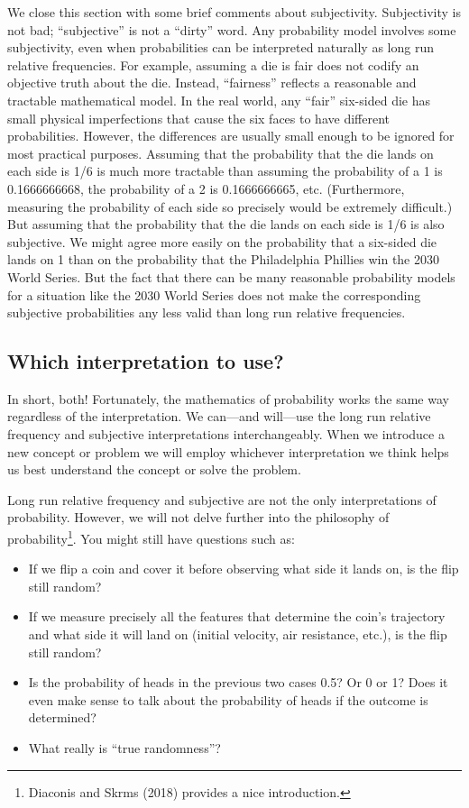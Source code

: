 \documentclass[
  letterpaper,
  DIV=11,
  numbers=noendperiod]{scrreprt}
\providecommand{\tightlist}{%
  \setlength{\itemsep}{0pt}\setlength{\parskip}{0pt}}
\theoremstyle{plain}
\theoremstyle{definition}
\theoremstyle{definition}
\theoremstyle{definition}
\theoremstyle{remark}
\begin{document}
We close this section with some brief comments about subjectivity.
Subjectivity is not bad; ``subjective'' is not a ``dirty'' word. Any
probability model involves some subjectivity, even when probabilities
can be interpreted naturally as long run relative frequencies. For
example, assuming a die is fair does not codify an objective truth about
the die. Instead, ``fairness'' reflects a reasonable and tractable
mathematical model. In the real world, any ``fair'' six-sided die has
small physical imperfections that cause the six faces to have different
probabilities. However, the differences are usually small enough to be
ignored for most practical purposes. Assuming that the probability that
the die lands on each side is 1/6 is much more tractable than assuming
the probability of a 1 is 0.1666666668, the probability of a 2 is
0.1666666665, etc. (Furthermore, measuring the probability of each side
so precisely would be extremely difficult.) But assuming that the
probability that the die lands on each side is 1/6 is also subjective.
We might agree more easily on the probability that a six-sided die lands
on 1 than on the probability that the Philadelphia Phillies win the 2030
World Series. But the fact that there can be many reasonable probability
models for a situation like the 2030 World Series does not make the
corresponding subjective probabilities any less valid than long run
relative frequencies.

\subsection{Which interpretation to
use?}\label{sec-which-interpretation}

In short, both! Fortunately, the mathematics of probability works the
same way regardless of the interpretation. We can---and will---use the
long run relative frequency and subjective interpretations
interchangeably. When we introduce a new concept or problem we will
employ whichever interpretation we think helps us best understand the
concept or solve the problem.

Long run relative frequency and subjective are not the only
interpretations of probability. However, we will not delve further into
the philosophy of probability\footnote{Diaconis and Skrms (2018)
  provides a nice introduction.}. You might still have questions such
as:

\begin{itemize}
\tightlist
\item
  If we flip a coin and cover it before observing what side it lands on,
  is the flip still random?
\item
  If we measure precisely all the features that determine the coin's
  trajectory and what side it will land on (initial velocity, air
  resistance, etc.), is the flip still random?
\item
  Is the probability of heads in the previous two cases 0.5? Or 0 or 1?
  Does it even make sense to talk about the probability of heads if the
  outcome is determined?
\item
  What really is ``true randomness''?
\end{itemize}
\end{document}

